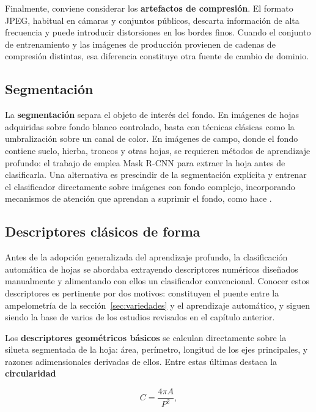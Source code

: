 Finalmente, conviene considerar los \textbf{artefactos de compresión}. El
formato JPEG, habitual en cámaras y conjuntos públicos, descarta
información de alta frecuencia y puede introducir distorsiones en los
bordes finos. Cuando el conjunto de entrenamiento y las imágenes de
producción provienen de cadenas de compresión distintas, esa diferencia
constituye otra fuente de cambio de dominio.

\subsection{Segmentación}

La \textbf{segmentación} separa el objeto de interés del fondo. En
imágenes de hojas adquiridas sobre fondo blanco controlado, basta con
técnicas clásicas como la umbralización sobre un canal de color. En
imágenes de campo, donde el fondo contiene suelo, hierba, troncos y otras
hojas, se requieren métodos de aprendizaje profundo: el trabajo de
\citet{adao2025} emplea Mask R-CNN para extraer la hoja antes de
clasificarla. Una alternativa es prescindir de la segmentación explícita y
entrenar el clasificador directamente sobre imágenes con fondo complejo,
incorporando mecanismos de atención que aprendan a suprimir el fondo, como
hace \citet{deng2025}.

\subsection{Descriptores clásicos de forma}
\label{sec:descriptores}

Antes de la adopción generalizada del aprendizaje profundo, la
clasificación automática de hojas se abordaba extrayendo descriptores
numéricos diseñados manualmente y alimentando con ellos un clasificador
convencional. Conocer estos descriptores es pertinente por dos motivos:
constituyen el puente entre la ampelometría de la
sección~\ref{sec:variedades} y el aprendizaje automático, y siguen siendo
la base de varios de los estudios revisados en el capítulo anterior.

Los \textbf{descriptores geométricos básicos} se calculan directamente
sobre la silueta segmentada de la hoja: área, perímetro, longitud de los
ejes principales, y razones adimensionales derivadas de ellos. Entre estas
últimas destaca la \textbf{circularidad}

\begin{equation}
C = \frac{4\pi A}{P^{2}},
\label{eq:circularidad}
\end{equation}

